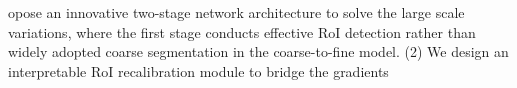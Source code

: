 opose an innovative two-stage network architecture to solve the large scale variations, where the first stage conducts effective RoI detection rather than widely adopted coarse segmentation in the coarse-to-fine model.
(2) We design an interpretable RoI recalibration module to bridge the gradients 